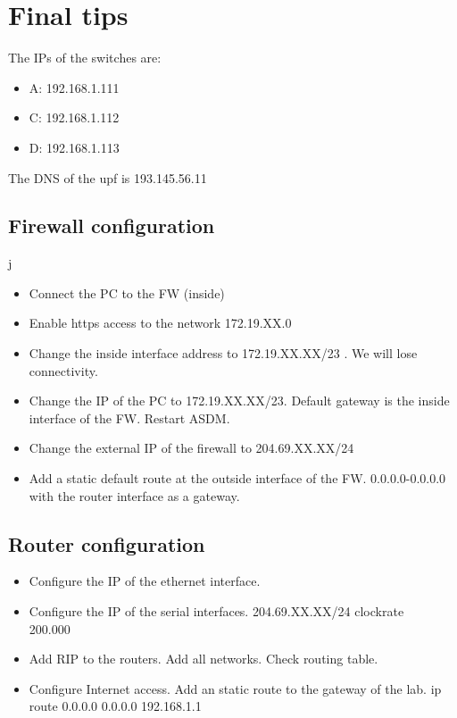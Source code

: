\section{Final tips}
\label{sec:final-tips}

The IPs of the switches are:
\begin{itemize}
\item A: 192.168.1.111
\item C: 192.168.1.112
\item D: 192.168.1.113
\end{itemize}

The DNS of the upf is 193.145.56.11

\subsection{Firewall configuration}
j
\begin{itemize}
\item Connect the PC to the FW (inside)
\item Enable https access to the network 172.19.XX.0
\item Change the inside interface address to 172.19.XX.XX/23 . We will lose connectivity.
\item Change the IP of the PC to 172.19.XX.XX/23. Default gateway is the inside interface of the FW. Restart ASDM.
\item Change the external IP of the firewall to 204.69.XX.XX/24
\item Add a static default route at the outside interface of the FW. 0.0.0.0-0.0.0.0 with the router interface as a gateway.
\end{itemize}

\subsection{Router configuration}
\begin{itemize}
\item Configure the IP of the ethernet interface.
\item Configure the IP of the serial interfaces. 204.69.XX.XX/24 clockrate ~ 200.000
\item Add RIP to the routers. Add all networks. Check routing table.
\item Configure Internet access. Add an static route to the gateway of the lab. ip route 0.0.0.0 0.0.0.0 192.168.1.1
\end{itemize}

